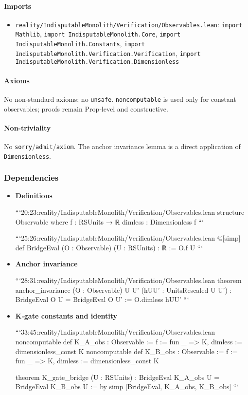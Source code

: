 \documentclass{article}
\newcommand{\FileRef}[1]{\texttt{#1}}
\begin{document}
\paragraph{Imports}
\begin{itemize}[leftmargin=*]
  \item \FileRef{reality/IndisputableMonolith/Verification/Observables.lean}: \texttt{import Mathlib}, \texttt{import IndisputableMonolith.Core}, \texttt{import IndisputableMonolith.Constants}, \texttt{import IndisputableMonolith.Verification.Verification}, \texttt{import IndisputableMonolith.Verification.Dimensionless}
\end{itemize}

\paragraph{Axioms}
No non‑standard axioms; no \texttt{unsafe}. \texttt{noncomputable} is used only for constant observables; proofs remain Prop‑level and constructive.

\paragraph{Non-triviality}
No \texttt{sorry}/\texttt{admit}/\texttt{axiom}. The anchor invariance lemma is a direct application of \texttt{Dimensionless}.

\subsubsection{Dependencies}
\begin{itemize}[leftmargin=*]
  \item \textbf{Definitions}

```20:23:reality/IndisputableMonolith/Verification/Observables.lean
structure Observable where
  f       : RSUnits → ℝ
  dimless : Dimensionless f
```

```25:26:reality/IndisputableMonolith/Verification/Observables.lean
@[simp] def BridgeEval (O : Observable) (U : RSUnits) : ℝ := O.f U
```

  \item \textbf{Anchor invariance}

```28:31:reality/IndisputableMonolith/Verification/Observables.lean
theorem anchor_invariance (O : Observable) {U U'}
  (hUU' : UnitsRescaled U U') : BridgeEval O U = BridgeEval O U' :=
  O.dimless hUU'
```

  \item \textbf{K‑gate constants and identity}

```33:45:reality/IndisputableMonolith/Verification/Observables.lean
noncomputable def K_A_obs : Observable := { f := fun _ => K, dimless := dimensionless_const K }
noncomputable def K_B_obs : Observable := { f := fun _ => K, dimless := dimensionless_const K }

theorem K_gate_bridge (U : RSUnits) : BridgeEval K_A_obs U = BridgeEval K_B_obs U := by
  simp [BridgeEval, K_A_obs, K_B_obs]
```
\end{itemize}
\end{document}
